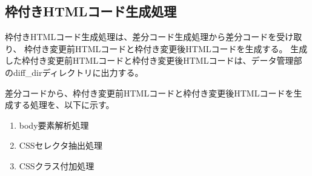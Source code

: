 

\subsection{枠付きHTMLコード生成処理}\label{subsec:modified_html_generate}
枠付きHTMLコード生成処理は、差分コード生成処理から差分コードを受け取り、
枠付き変更前HTMLコードと枠付き変更後HTMLコードを生成する。
生成した枠付き変更前HTMLコードと枠付き変更後HTMLコードは、データ管理部のdiff\_dirディレクトリに出力する。
\par
差分コードから、枠付き変更前HTMLコードと枠付き変更後HTMLコードを生成する処理を、以下に示す。
\begin{enumerate}
    \item body要素解析処理
    \item CSSセレクタ抽出処理
    \item CSSクラス付加処理
\end{enumerate}

